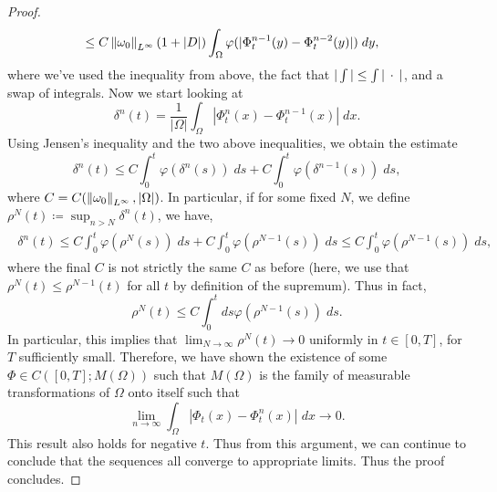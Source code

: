 \documentclass{article}
\begin{document}
\begin{proof}
\begin{align*}
\begin{split}
			&\leq C\left\Vert \omega_{0} \right\Vert_{L^{\infty}}(1 + |D|)\int_{\Omega}\varphi(|\Phi_{t}^{n-1}(y) - \Phi_{t}^{n-2}(y)|)\;dy, 
		\end{split} 
	\end{align*}
	where we've used the inequality from above, the fact that $|\int |\leq \int |\hspace{2pt}\cdot\hspace{2pt}|$, and a swap of integrals. Now we start looking at 
	\begin{equation*}
		\delta^{n}(t) = \frac{1}{|\Omega|}\int_{\Omega}|\Phi^{n}_{t}(x) - \Phi^{n-1}_{t}(x)|\;dx. 
	\end{equation*}
	Using Jensen's inequality and the two above inequalities, we obtain the estimate 
	\begin{equation*}
		\delta^{n}(t) \leq C\int_{0}^{t}\varphi(\delta^{n}(s))\;ds + C\int_{0}^{t}\varphi(\delta^{n-1}(s))\;ds, 
	\end{equation*} 
	where $C = C(\left\Vert \omega_{0} \right\Vert_{L^{\infty}}, |\Omega|)$. In particular, if for some fixed $N$, we define $\rho^{N}(t) \coloneqq \sup_{n > N}\delta^{n}(t)$, we have, 
	\begin{align*}
		\begin{split}
			\delta^{n}(t) \leq C\int_{0}^{t}\varphi(\rho^{N}(s))\;ds + C\int_{0}^{t}\varphi(\rho^{N -1}(s))\;ds \leq C\int_{0}^{t}\varphi(\rho^{N-1}(s))\;ds, 
		\end{split} 
	\end{align*}
	where the final $C$ is not strictly the same $C$ as before (here, we use that $\rho^{N}(t) \leq \rho^{N-1}(t)$ for all $t$ by definition of the supremum). Thus in fact, 
	\begin{equation*}
		\rho^{N}(t) \leq C\int_{0}^{t}ds\varphi(\rho^{N-1}(s))\;ds. 
	\end{equation*}
	In particular, this implies that $\lim_{N \to \infty}\rho^{N}(t) \to 0$ uniformly in $t \in [0,T]$, for $T$ sufficiently small. Therefore, we have shown the existence of some $\Phi \in C([0,T]; M(\Omega))$ such that $M(\Omega)$ is the family of measurable transformations of $\Omega$ onto itself such that 
	\begin{equation*}
		\lim_{n \to \infty}\int_{\Omega}|\Phi_{t}(x) - \Phi_{t}^{n}(x)|\;dx \to 0. 
	\end{equation*}
	This result also holds for negative $t$. Thus from this argument, we can continue to conclude that the sequences all converge to appropriate limits. Thus the proof concludes. 
\end{proof} 
\end{document}
